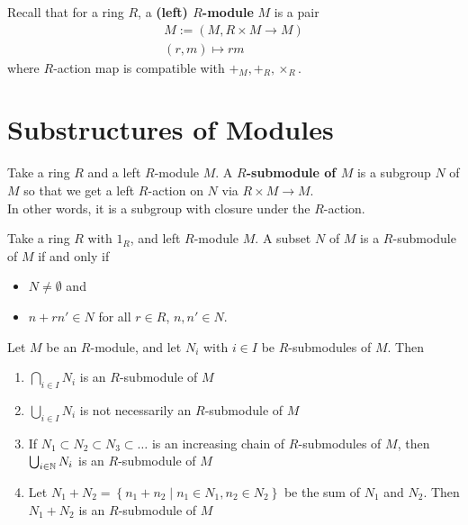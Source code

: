 \documentclass{memoir}
\begin{document}


Recall that for a ring \(R\), a \textbf{(left) \(R\)-module} \(M\) is a pair
\begin{align*}
	M:= (M, R\times M\to M)\\
	(r,m) \mapsto rm
\end{align*}
where \(R\)-action map is compatible with \(+_M, +_R, \times_R\).

\section{Substructures of Modules}
\label{sec:substructures_of_modules}

\begin{defn}[Submodule]
	Take a ring \(R\) and a left \(R\)-module \(M\). A \textbf{\(R\)-submodule of \(M\)} is a subgroup \(N\) of \(M\) so that we get a left \(R\)-action on \(N\) via \(R\times M\to M\).\\

	In other words, it is a subgroup with closure under the \(R\)-action.
\end{defn}

\begin{prop}
	Take a ring \(R\) with \(1_R\), and left \(R\)-module \(M\). A subset \(N\) of \(M\) is a \(R\)-submodule of \(M\) if and only if
	\begin{itemize}
		\item \(N \neq \emptyset\) and
		\item \(n+rn' \in N\) for all \(r \in R\), \(n,n' \in N\).
	\end{itemize}
\end{prop}

\begin{prop}
	Let \(M\) be an \(R\)-module, and let \(N_{i}\) with \(i \in I\) be \(R\)-submodules of \(M\). Then
	\begin{enumerate}
		\item \(\bigcap_{i \in  I} N_i\) is an \(R\)-submodule of \(M\) 
		\item \(\bigcup_{i \in  I} N_i\) is not necessarily an \(R\)-submodule of \(M\)
		\item If \(N_1\subset N_2\subset N_3\subset \ldots\) is an increasing chain of \(R\)-submodules of \(M\), then \(\bigcup_{i \in \mathbb{N}} N_i\) is an \(R\)-submodule of \(M\)
		\item Let \(N_1+N_2 = \left\{n_1+n_2 \mid n_1 \in N_1, n_2 \in N_2 \right\} \) be the sum of \(N_1\) and \(N_2\). Then \(N_1+N_2\) is an \(R\)-submodule of \(M\)
	\end{enumerate}
\end{prop}
\end{document}
